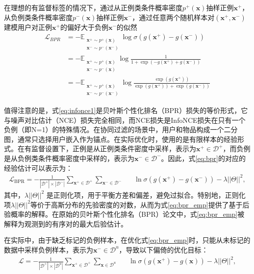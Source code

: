 在理想的有监督标签的情况下，通过从正例类条件概率密度$p^+(\mathbf x)$抽样正例$\mathbf{x}^+$，从负例类条件概率密度$p^-(\mathbf x)$抽样正例$\mathbf{x}^-$，通过任意两个随机样本对$(\mathbf{x}^+, \mathbf{x}^-)$建模用户对正例$\mathbf{x}^+$的偏好大于负例$\mathbf{x}^-$的似然
\begin{align}\label{eq:bpr}
	\mathcal{L}_{BPR} &= - \mathbb{E}_{\substack{\mathbf x^+ \sim p^+(\mathbf x) \\ \mathbf x^- \sim p^-(\mathbf x^-)}} \log \sigma(g(\mathbf{x}^+) - g(\mathbf{x}^-)) \\
	&=  - \mathbb{E}_{\substack{\mathbf x^+ \sim p^+(\mathbf x) \\ \mathbf x^- \sim p^-(\mathbf x)}}\log \frac{1}{1+\exp(-g(\mathbf{x}^+) + g(\mathbf{x}^-))} \nonumber \\
	&=  - \mathbb{E}_{\substack{\mathbf x^+ \sim p^+(\mathbf x) \\ \mathbf x^- \sim p^-(\mathbf x^-)}}\log\frac{\exp(g(\mathbf{x}^+))}{\exp(g(\mathbf{x}^+))+\exp( g(\mathbf{x}^-))} \label{eq:infonce1}
\end{align}

值得注意的是，式\eqref{eq:infonce1}是贝叶斯个性化排名（BPR）损失的等价形式，它与噪声对比估计（NCE）损失\cite{Gutmann:2010:ICAIS}完全相同，而NCE损失是InfoNCE损失\cite{Oord:2018:arxiv}在只有一个负例（即N=1）的特殊情况。在协同过滤的场景中，用户和物品构成一个二分图，通常只选择用户嵌入作为锚点。在实际优化时，使用的是有限样本的经验形式。在有监督设置下，正例是从正例类条件密度中采样，表示为$\mathbf{x}^+ \in \mathcal{D}^+$，而负例是从负例类条件概率密度中采样的，表示为$\mathbf{x}^- \in \mathcal{D}^-$。因此，式\eqref{eq:bpr}的对应的经验估计可以表示为：
\begin{eqnarray}\label{eq:bpr_emp}
	\mathcal{L}_\text{BPR} =- \frac{1}{|\mathcal{D}^+|\times |\mathcal{D}^-|} \sum_{\mathbf{x}^+ \in \mathcal{D}^+}\sum_{\mathbf{x}^- \in \mathcal{D}^-} && \ln \sigma(g(\mathbf{x}^+) - g(\mathbf{x}^-))  - \lambda ||\Theta||^2,
\end{eqnarray}
其中，$\lambda ||\Theta||^2$ 是正则化项，用于平衡方差和偏差，避免过拟合。特别地，正则化项$\lambda ||\Theta||^2$等价于高斯分布的先验密度的对数，从而为式\eqref{eq:bpr_emp}提供了基于后验概率的解释。在原始的贝叶斯个性化排名（BPR）论文\cite{Steffen:2009:UAI}中，式\eqref{eq:bpr_emp}被解释为观测到的有序对的最大后验估计。

在实际中，由于缺乏标记的负例样本，在优化式\eqref{eq:bpr_emp}时，只能从未标记的数据中采样负例样本，表示为$\mathbf{x}^- \in \mathcal{D}^u$，导致以下偏倚的优化目标：
\begin{eqnarray}\label{eq:bpr_emp_biased}
	\mathcal{L} =- \frac{1}{|\mathcal{D}^+|\times |\mathcal{D}^u|} \sum_{\mathbf{x}^+ \in \mathcal{D}^+}\sum_{\mathbf{x} \in \mathcal{D}^u} && \ln \sigma(g(\mathbf{x}^+) - g(\mathbf{x})) - \lambda ||\Theta||^2,
\end{eqnarray}

